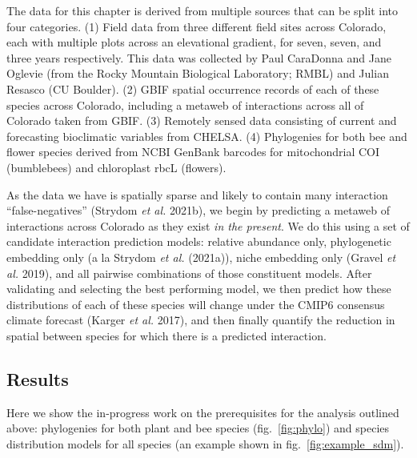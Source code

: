 \documentclass[11pt]{article}
\begin{document}
The data for this chapter is derived from multiple sources that can be
split into four categories. (1) Field data from three different field
sites across Colorado, each with multiple plots across an elevational
gradient, for seven, seven, and three years respectively. This data was
collected by Paul CaraDonna and Jane Oglevie (from the Rocky Mountain
Biological Laboratory; RMBL) and Julian Resasco (CU Boulder). (2) GBIF
spatial occurrence records of each of these species across Colorado,
including a metaweb of interactions across all of Colorado taken from
GBIF. (3) Remotely sensed data consisting of current and forecasting
bioclimatic variables from CHELSA. (4) Phylogenies for both bee and
flower species derived from NCBI GenBank barcodes for mitochondrial COI
(bumblebees) and chloroplast rbcL (flowers).

As the data we have is spatially sparse and likely to contain many
interaction ``false-negatives'' (Strydom \emph{et al.} 2021b), we begin
by predicting a metaweb of interactions across Colorado as they exist
\emph{in the present}. We do this using a set of candidate interaction
prediction models: relative abundance only, phylogenetic embedding only
(a la Strydom \emph{et al.} (2021a)), niche embedding only (Gravel
\emph{et al.} 2019), and all pairwise combinations of those constituent
models. After validating and selecting the best performing model, we
then predict how these distributions of each of these species will
change under the CMIP6 consensus climate forecast (Karger \emph{et al.}
2017), and then finally quantify the reduction in spatial between
species for which there is a predicted interaction.

\hypertarget{results-1}{%
\subsection{Results}\label{results-1}}

Here we show the in-progress work on the prerequisites for the analysis
outlined above: phylogenies for both plant and bee species
(fig.~\ref{fig:phylo}) and species distribution models for all species
(an example shown in fig.~\ref{fig:example_sdm}).
\end{document}
